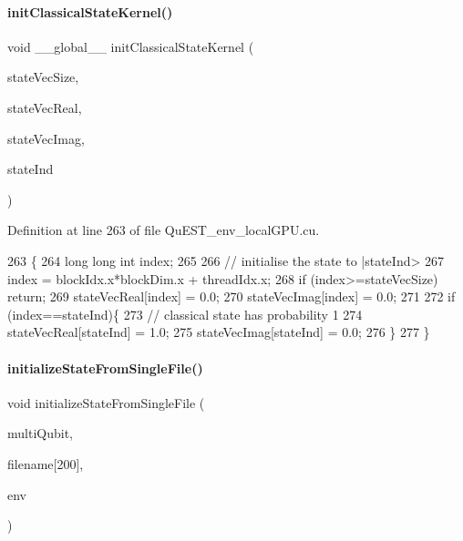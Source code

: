 \paragraph{\texorpdfstring{init\+Classical\+State\+Kernel()}{initClassicalStateKernel()}}
{\footnotesize\ttfamily void \+\_\+\+\_\+global\+\_\+\+\_\+ init\+Classical\+State\+Kernel (\begin{DoxyParamCaption}\item[{long long int}]{state\+Vec\+Size,  }\item[{\mbox{\hyperlink{QuEST__precision_8h_a4b654506f18b8bfd61ad2a29a7e38c25}{R\+E\+AL}} $\ast$}]{state\+Vec\+Real,  }\item[{\mbox{\hyperlink{QuEST__precision_8h_a4b654506f18b8bfd61ad2a29a7e38c25}{R\+E\+AL}} $\ast$}]{state\+Vec\+Imag,  }\item[{long long int}]{state\+Ind }\end{DoxyParamCaption})}



Definition at line 263 of file Qu\+E\+S\+T\+\_\+env\+\_\+local\+G\+P\+U.\+cu.


\begin{DoxyCode}
263                                                                                                            
                               \{
264     \textcolor{keywordtype}{long} \textcolor{keywordtype}{long} \textcolor{keywordtype}{int} index;
265 
266     \textcolor{comment}{// initialise the state to |stateInd>}
267     index = blockIdx.x*blockDim.x + threadIdx.x;
268     \textcolor{keywordflow}{if} (index>=stateVecSize) \textcolor{keywordflow}{return};
269     stateVecReal[index] = 0.0;
270     stateVecImag[index] = 0.0;
271 
272     \textcolor{keywordflow}{if} (index==stateInd)\{
273         \textcolor{comment}{// classical state has probability 1}
274         stateVecReal[stateInd] = 1.0;
275         stateVecImag[stateInd] = 0.0;
276     \}
277 \}
\end{DoxyCode}
\mbox{\label{QuEST__env__localGPU_8cu_a433876ee9f3bcc54af346300f571fc3c}} 
\paragraph{\texorpdfstring{initialize\+State\+From\+Single\+File()}{initializeStateFromSingleFile()}}
{\footnotesize\ttfamily void initialize\+State\+From\+Single\+File (\begin{DoxyParamCaption}\item[{\mbox{\hyperlink{structMultiQubit}{Multi\+Qubit}} $\ast$}]{multi\+Qubit,  }\item[{char}]{filename\mbox{[}200\mbox{]},  }\item[{\mbox{\hyperlink{structQuESTEnv}{Qu\+E\+S\+T\+Env}}}]{env }\end{DoxyParamCaption})}



